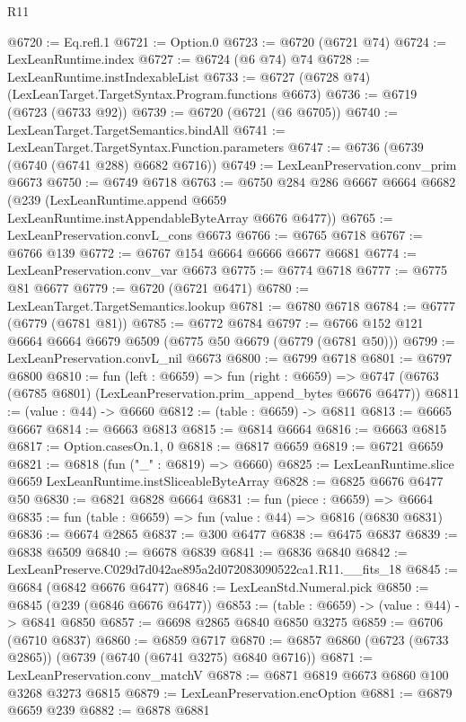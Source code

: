 \begin{lexlean}{R11}
\begin{coremodule}
@6720 := Eq.refl.{1}
@6721 := Option.{0}
@6723 := @6720 (@6721 @74)
@6724 := LexLeanRuntime.index
@6727 := @6724 (@6 @74) @74
@6728 := LexLeanRuntime.instIndexableList
@6733 := @6727 (@6728 @74) (LexLeanTarget.TargetSyntax.Program.functions @6673)
@6736 := @6719 (@6723 (@6733 @92))
@6739 := @6720 (@6721 (@6 @6705))
@6740 := LexLeanTarget.TargetSemantics.bindAll
@6741 := LexLeanTarget.TargetSyntax.Function.parameters
@6747 := @6736 (@6739 (@6740 (@6741 @288) @6682 @6716))
@6749 := LexLeanPreservation.conv_prim @6673
@6750 := @6749 @6718
@6763 := @6750
    @284
    @286
    @6667
    @6664
    @6682
    (@239 (LexLeanRuntime.append @6659 LexLeanRuntime.instAppendableByteArray @6676 @6477))
@6765 := LexLeanPreservation.convL_cons @6673
@6766 := @6765 @6718
@6767 := @6766 @139
@6772 := @6767 @154 @6664 @6666 @6677 @6681
@6774 := LexLeanPreservation.conv_var @6673
@6775 := @6774 @6718
@6777 := @6775 @81 @6677
@6779 := @6720 (@6721 @6471)
@6780 := LexLeanTarget.TargetSemantics.lookup
@6781 := @6780 @6718
@6784 := @6777 (@6779 (@6781 @81))
@6785 := @6772 @6784
@6797 := @6766 @152 @121 @6664 @6664 @6679 @6509 (@6775 @50 @6679 (@6779 (@6781 @50)))
@6799 := LexLeanPreservation.convL_nil @6673
@6800 := @6799 @6718
@6801 := @6797 @6800
@6810 := fun (left : @6659) =>
  fun (right : @6659) =>
  @6747 (@6763 (@6785 @6801) (LexLeanPreservation.prim_append_bytes @6676 @6477))
@6811 := (value : @44) -> @6660
@6812 := (table : @6659) -> @6811
@6813 := @6665 @6667
@6814 := @6663 @6813
@6815 := @6814 @6664
@6816 := @6663 @6815
@6817 := Option.casesOn.{1, 0}
@6818 := @6817 @6659
@6819 := @6721 @6659
@6821 := @6818 (fun ("_" : @6819) => @6660)
@6825 := LexLeanRuntime.slice @6659 LexLeanRuntime.instSliceableByteArray
@6828 := @6825 @6676 @6477 @50
@6830 := @6821 @6828 @6664
@6831 := fun (piece : @6659) => @6664
@6835 := fun (table : @6659) => fun (value : @44) => @6816 (@6830 @6831)
@6836 := @6674 @2865
@6837 := @300 @6477
@6838 := @6475 @6837
@6839 := @6838 @6509
@6840 := @6678 @6839
@6841 := @6836 @6840
@6842 := LexLeanPreserve.C029d7d042ae895a2d072083090522ca1.R11.__fits_18
@6845 := @6684 (@6842 @6676 @6477)
@6846 := LexLeanStd.Numeral.pick
@6850 := @6845 (@239 (@6846 @6676 @6477))
@6853 := (table : @6659) -> (value : @44) -> @6841 @6850
@6857 := @6698 @2865 @6840 @6850 @3275
@6859 := @6706 (@6710 @6837)
@6860 := @6859 @6717
@6870 := @6857 @6860 (@6723 (@6733 @2865)) (@6739 (@6740 (@6741 @3275) @6840 @6716))
@6871 := LexLeanPreservation.conv_matchV
@6878 := @6871 @6819 @6673 @6860 @100 @3268 @3273 @6815
@6879 := LexLeanPreservation.encOption
@6881 := @6879 @6659 @239
@6882 := @6878 @6881

\end{coremodule}
\end{lexlean}
